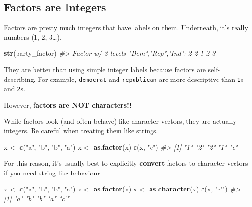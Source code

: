 \documentclass[]{book}
\newenvironment{Shaded}{\begin{snugshade}}{\end{snugshade}}
\newcommand{\KeywordTok}[1]{\textcolor[rgb]{0.13,0.29,0.53}{\textbf{#1}}}
\newcommand{\StringTok}[1]{\textcolor[rgb]{0.31,0.60,0.02}{#1}}
\newcommand{\CommentTok}[1]{\textcolor[rgb]{0.56,0.35,0.01}{\textit{#1}}}
\newcommand{\NormalTok}[1]{#1}
\begin{document}
\subsection{Factors are Integers}\label{factors-are-integers}

Factors are pretty much integers that have labels on them. Underneath,
it's really numbers (1, 2, 3\ldots{}).

\begin{Shaded}
\begin{Highlighting}[]
\KeywordTok{str}\NormalTok{(party_factor)}
\CommentTok{#>  Factor w/ 3 levels "Dem","Rep","Ind": 2 2 1 2 3}
\end{Highlighting}
\end{Shaded}

They are better than using simple integer labels because factors are
self-describing. For example, \texttt{democrat} and \texttt{republican}
are more descriptive than \texttt{1}s and \texttt{2}s.

However, \textbf{factors are NOT characters!!}

While factors look (and often behave) like character vectors, they are
actually integers. Be careful when treating them like strings.

\begin{Shaded}
\begin{Highlighting}[]
\NormalTok{x <-}\StringTok{ }\KeywordTok{c}\NormalTok{(}\StringTok{"a"}\NormalTok{, }\StringTok{"b"}\NormalTok{, }\StringTok{"b"}\NormalTok{, }\StringTok{"a"}\NormalTok{)}
\NormalTok{x <-}\StringTok{ }\KeywordTok{as.factor}\NormalTok{(x)}
\KeywordTok{c}\NormalTok{(x, }\StringTok{"c"}\NormalTok{)}
\CommentTok{#> [1] "1" "2" "2" "1" "c"}
\end{Highlighting}
\end{Shaded}

For this reason, it's usually best to explicitly \textbf{convert}
factors to character vectors if you need string-like behaviour.

\begin{Shaded}
\begin{Highlighting}[]
\NormalTok{x <-}\StringTok{ }\KeywordTok{c}\NormalTok{(}\StringTok{"a"}\NormalTok{, }\StringTok{"b"}\NormalTok{, }\StringTok{"b"}\NormalTok{, }\StringTok{"a"}\NormalTok{)}
\NormalTok{x <-}\StringTok{ }\KeywordTok{as.factor}\NormalTok{(x)}
\NormalTok{x <-}\StringTok{ }\KeywordTok{as.character}\NormalTok{(x)}
\KeywordTok{c}\NormalTok{(x, }\StringTok{"c'"}\NormalTok{)}
\CommentTok{#> [1] "a"  "b"  "b"  "a"  "c'"}
\end{Highlighting}
\end{Shaded}
\end{document}
